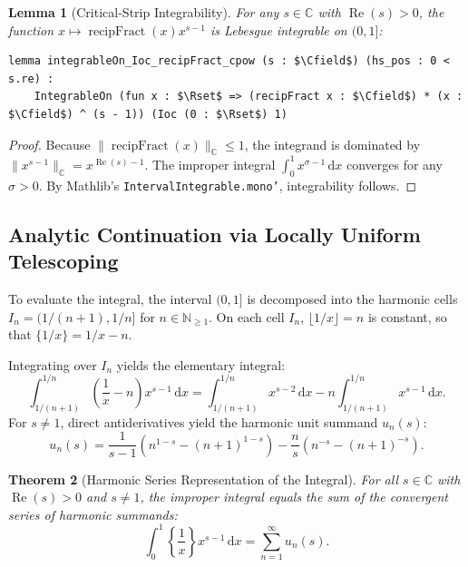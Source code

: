 \documentclass[11pt,a4paper]{article}
\newtheorem{theorem}{Theorem}[section]
\newtheorem{lemma}[theorem]{Lemma}
\theoremstyle{definition}
\newcommand{\dee}{\mathrm{d}}
\newcommand{\Nset}{\mathbb{N}}
\newcommand{\Rset}{\mathbb{R}}
\newcommand{\Cfield}{\mathbb{C}}
\begin{document}
\begin{lemma}[Critical-Strip Integrability]
For any $s \in \Cfield$ with $\operatorname{Re}(s) > 0$, the function $x \mapsto \operatorname{recipFract}(x) x^{s-1}$ is Lebesgue integrable on $(0, 1]$:
\begin{lstlisting}
lemma integrableOn_Ioc_recipFract_cpow (s : $\Cfield$) (hs_pos : 0 < s.re) :
    IntegrableOn (fun x : $\Rset$ => (recipFract x : $\Cfield$) * (x : $\Cfield$) ^ (s - 1)) (Ioc (0 : $\Rset$) 1)
\end{lstlisting}
\end{lemma}

\begin{proof}
Because $\|\operatorname{recipFract}(x)\|_{\Cfield} \le 1$, the integrand is dominated by $\|x^{s-1}\|_{\Cfield} = x^{\operatorname{Re}(s)-1}$. The improper integral $\int_0^1 x^{\sigma-1}\,\dee x$ converges for any $\sigma > 0$. By Mathlib's \texttt{IntervalIntegrable.mono'}, integrability follows.
\end{proof}

\subsection{Analytic Continuation via Locally Uniform Telescoping}

To evaluate the integral, the interval $(0, 1]$ is decomposed into the harmonic cells $I_n = (1/(n+1), 1/n]$ for $n \in \Nset_{\ge 1}$. On each cell $I_n$, $\lfloor 1 / x \rfloor = n$ is constant, so that $\{1/x\} = 1/x - n$. 

Integrating over $I_n$ yields the elementary integral:
\begin{equation}
\int_{1/(n+1)}^{1/n} \left( \frac{1}{x} - n \right) x^{s-1} \,\dee x = \int_{1/(n+1)}^{1/n} x^{s-2} \,\dee x - n \int_{1/(n+1)}^{1/n} x^{s-1} \,\dee x.
\end{equation}
For $s \neq 1$, direct antiderivatives yield the harmonic unit summand $u_n(s)$:
\begin{equation}
u_n(s) = \frac{1}{s - 1} \left( n^{1 - s} - (n + 1)^{1 - s} \right) - \frac{n}{s} \left( n^{-s} - (n + 1)^{-s} \right).
\end{equation}

\begin{theorem}[Harmonic Series Representation of the Integral]
For all $s \in \Cfield$ with $\operatorname{Re}(s) > 0$ and $s \neq 1$, the improper integral equals the sum of the convergent series of harmonic summands:
\begin{equation}
\int_0^1 \left\{ \frac{1}{x} \right\} x^{s-1}\,\dee x = \sum_{n=1}^\infty u_n(s).
\end{equation}
\end{theorem}
\end{document}

